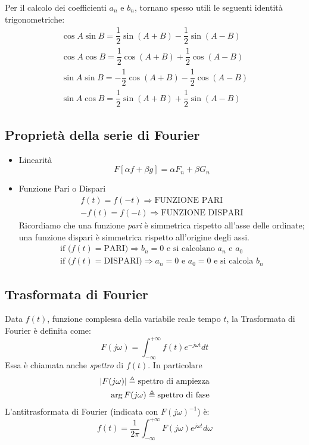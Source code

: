 \documentclass[a4paper]{report}
\begin{document}
Per il calcolo dei coefficienti $a_n$ e $b_n$, tornano spesso utili le
seguenti identit\`a trigonometriche:
\begin{eqnarray*}
  \cos A \sin B = \dfrac{1}{2}\sin (A+B)-\dfrac{1}{2}\sin(A-B)\\
  \cos A \cos B = \dfrac{1}{2}\cos(A+B)+\dfrac{1}{2}\cos(A-B)\\
  \sin A \sin B = - \dfrac{1}{2} \cos (A + B) - \dfrac{1}{2} \cos(A - B)\\
  \sin A \cos B = \dfrac{1}{2} \sin (A + B) + \dfrac{1}{2} \sin (A - B)
\end{eqnarray*}

\subsection{Propriet\`a della serie di Fourier}
\begin{itemize}
\item Linearit\`a
  \subitem 
  \begin{displaymath}
    F[\alpha f + \beta g] = \alpha F_n + \beta G_n
  \end{displaymath}
\item Funzione Pari o Dispari
  \subitem 
  \begin{eqnarray*}
    f(t) = f(-t) \Longrightarrow \textrm{FUNZIONE PARI}\\
    -f(t) = f(-t)\Longrightarrow \textrm{FUNZIONE DISPARI}
\end{eqnarray*}
  Ricordiamo che una funzione {\em pari} \`e simmetrica rispetto
  all'asse delle ordinate; una funzione dispari \`e simmetrica
  rispetto all'origine degli assi.
\subitem 
\begin{eqnarray*}
  \textrm{if ($f(t)=$PARI)$\Longrightarrow b_n=0$ e si calcolano $a_n$ e $a_0$}\\
  \textrm{if ($f(t)=$DISPARI)$\Longrightarrow a_n=0$ e $a_0=0$ e si calcola $b_n$}
\end{eqnarray*}
\end{itemize}

\subsection{Trasformata di Fourier}
Data $f(t)$, funzione complessa della variabile reale tempo $t$, la
Trasformata di Fourier \`e definita come:
\begin{equation}\label{eq:tdf}
  F(j\omega) = \int_{-\infty}^{+\infty}f(t) e^{-j\omega t} dt
\end{equation}
Essa \`e chiamata anche \emph{spettro} di $f(t)$. In particolare
\begin{eqnarray*}
  |F(j\omega)| \triangleq \textrm{spettro di ampiezza}\index{Spettro
    di ampiezza}\\
  \arg F(j\omega)\triangleq \textrm{spettro di fase}\index{Spettro di fase}
\end{eqnarray*}
L'antitrasformata di Fourier (indicata con $F(j\omega)^{-1}$) \`e:
\begin{equation}\label{eq:antitrasfF}
  f(t) = \frac{1}{2\pi} \int_{-\infty}^{+\infty} F(j\omega)e^{j\omega t} d\omega
\end{equation}
\end{document}
